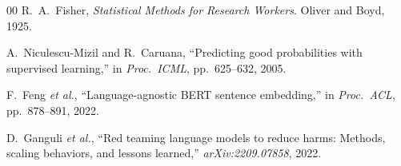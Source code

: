 \documentclass[conference]{IEEEtran}
\begin{document}
\begin{thebibliography}{00}
R.~A.~Fisher, \emph{Statistical Methods for Research Workers}. Oliver and Boyd, 1925.

A.~Niculescu-Mizil and R.~Caruana, ``Predicting good probabilities with supervised learning,'' in \emph{Proc.\ ICML}, pp.~625--632, 2005.

F.~Feng \emph{et al.}, ``Language-agnostic BERT sentence embedding,'' in \emph{Proc.\ ACL}, pp.~878--891, 2022.

D.~Ganguli \emph{et al.}, ``Red teaming language models to reduce harms: Methods, scaling behaviors, and lessons learned,'' \emph{arXiv:2209.07858}, 2022.

\end{thebibliography}

\balance
\end{document}
